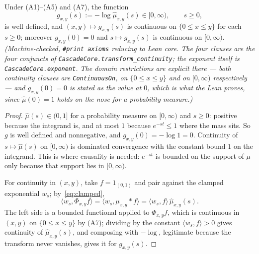 \begin{lemma}\label{lem:transform-continuity}
\leanok
Under (A1)--(A5) and (A7), the function
\[
  g_{x,y}(s) := -\log \hat\mu_{x,y}(s) \in [0,\infty), \qquad s \ge 0,
\]
is well defined, and $(x,y) \mapsto g_{x,y}(s)$ is continuous on $\{0 \le x \le y\}$ for each
$s \ge 0$; moreover $g_{x,y}(0) = 0$ and $s \mapsto g_{x,y}(s)$ is continuous on
$[0,\infty)$.
\statusT\quad\emph{(Machine-checked, \texttt{\#print axioms} reducing to Lean core. The four
clauses are the four conjuncts of
\texttt{CascadeCore.transform\_continuity}; the exponent itself is
\texttt{CascadeCore.exponent}. The domain restrictions are explicit there --- both
continuity clauses are \texttt{ContinuousOn}, on $\{0 \le x \le y\}$ and on $[0,\infty)$
respectively --- and $g_{x,y}(0) = 0$ is stated as the value at $0$, which is what the Lean
proves, since $\hat\mu(0) = 1$ holds on the nose for a probability measure.)}
\end{lemma}

\begin{proof}
\leanok
$\hat\mu(s) \in (0, 1]$ for a probability measure on $[0,\infty)$ and $s \ge 0$: positive
because the integrand is, and at most $1$ because $e^{-st} \le 1$ where the mass sits. So $g$
is well defined and nonnegative, and $g_{x,y}(0) = -\log 1 = 0$. Continuity of
$s \mapsto \hat\mu(s)$ on $[0,\infty)$ is dominated convergence with the constant bound $1$
on the integrand. This is where causality is needed: $e^{-st}$ is bounded on the support of
$\mu$ only because that support lies in $[0,\infty)$.

For continuity in $(x,y)$, take $f = 1_{(0,1)}$ and pair against the clamped exponential
$w_s$; by~\ref{eq:clamped},
\[
  \langle w_s, \Phi_{x,y} f\rangle
  = \langle w_s, \mu_{x,y} * f\rangle = \langle w_s, f\rangle\,\hat\mu_{x,y}(s).
\]
The left side is a bounded functional applied to $\Phi_{x,y} f$, which is continuous in $(x,y)$
on $\{0 \le x \le y\}$ by (A7); dividing by the constant $\langle w_s, f\rangle > 0$ gives
continuity of $\hat\mu_{x,y}(s)$, and composing with $-\log$, legitimate because the transform
never vanishes, gives it for $g_{x,y}(s)$.
\end{proof}

